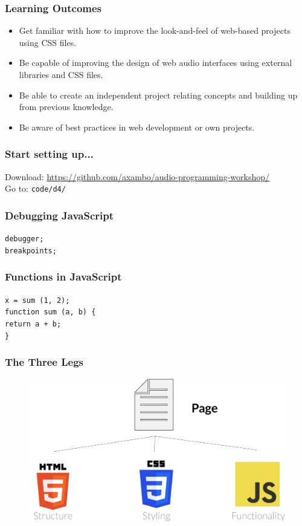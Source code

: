 \documentclass[screen, aspectratio=43]{beamer}
\begin{document}
%
\begin{frame}
\frametitle{Learning Outcomes}
\begin{itemize}
\item Get familiar with how to improve the look-and-feel of web-based projects using CSS files.
\item Be capable of improving the design of web audio interfaces using external libraries and CSS files.
\item Be able to create an independent project relating concepts and building up from previous knowledge.
\item Be aware of best practices in web development or own projects.
\end{itemize}
\end{frame}
%
\begin{frame}
\frametitle{Start setting up...}
Download: \url{https://github.com/axambo/audio-programming-workshop/} 
\\
\vspace{10 mm}
Go to: \texttt{code/d4/}
\end{frame}
%	
\begin{frame}
\frametitle{Debugging JavaScript}
 \texttt{debugger;}\\
 \texttt{breakpoints;} 
\end{frame}
%
\begin{frame}
\frametitle{Functions in JavaScript}
\texttt{x = sum (1, 2);}\\
\vspace{10 mm}
\texttt{function sum (a, b) \{}\\
\setlength\parindent{24pt} \texttt{return a + b;}\\
\setlength\parindent{0pt}\texttt{\}}
\end{frame}
%
\begin{frame}
\frametitle{The Three Legs}
   \begin{figure}
	\includegraphics[scale=0.2]{img/three-legs-codeanalogies-blog.png}
    \end{figure}
\vspace{10 mm}
\end{frame}
\end{document}
